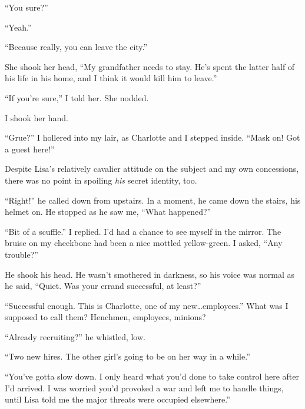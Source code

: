 ``You sure?''



``Yeah.''



``Because really, you can leave the city.''



She shook her head, ``My grandfather needs to stay.  He's spent the latter half of his life in his home, and I think it would kill him to leave.''



``If you're sure,'' I told her.  She nodded.



I shook her hand.



\blacksquare



``Grue?'' I hollered into my lair, as Charlotte and I stepped inside.  ``Mask on!  Got a guest here!''



Despite Lisa's relatively cavalier attitude on the subject and my own concessions, there was no point in spoiling \emph{his} secret identity, too.



``Right!'' he called down from upstairs.  In a moment, he came down the stairs, his helmet on.  He stopped as he saw me, ``What happened?''



``Bit of a scuffle.''  I replied.  I'd had a chance to see myself in the mirror.  The bruise on my cheekbone had been a nice mottled yellow-green.  I asked, ``Any trouble?''



He shook his head.  He wasn't smothered in darkness, so his voice was normal as he said, ``Quiet.  Was your errand successful, at least?''



``Successful enough.  This is Charlotte, one of my new\ldots employees.'' What was I supposed to call them?  Henchmen, employees, minions?



``Already recruiting?'' he whistled, low.



``Two new hires.  The other girl's going to be on her way in a while.''



``You've gotta slow down.  I only heard what you'd done to take control here after I'd arrived.  I was worried you'd provoked a war and left me to handle things, until Lisa told me the major threats were occupied elsewhere.''



